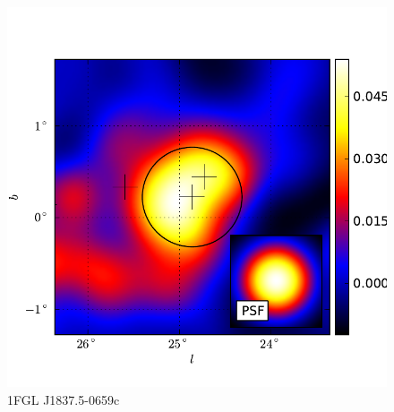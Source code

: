 \documentclass[preprint]{aastex}
\begin{document}
  \begin{figure}
    \begin{center}
      \includegraphics[type=pdf,ext=.pdf,read=.pdf]{source_plots/source_1FGL_J1837.5-0659c}
    \end{center}
    \caption{1FGL J1837.5-0659c}
  \end{figure}
\end{document}
